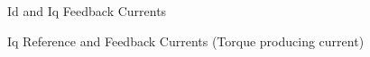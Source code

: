 \begin{frame}{Id and Iq Feedback Currents}
	\begin{figure}
		\centering


	\end{figure}
\end{frame}

\begin{frame}{Iq Reference and Feedback Currents (Torque producing current)}
	\begin{figure}
		\centering


	\end{figure}
\end{frame}

